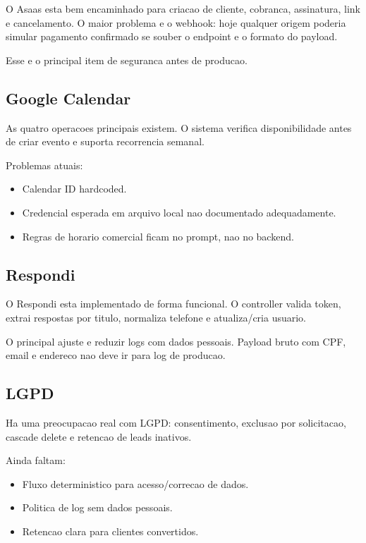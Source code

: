 \documentclass[11pt,a4paper]{article}
\begin{document}
O Asaas esta bem encaminhado para criacao de cliente, cobranca, assinatura, link e cancelamento. O maior problema e o webhook: hoje qualquer origem poderia simular pagamento confirmado se souber o endpoint e o formato do payload.

Esse e o principal item de seguranca antes de producao.

\subsection{Google Calendar}

As quatro operacoes principais existem. O sistema verifica disponibilidade antes de criar evento e suporta recorrencia semanal.

Problemas atuais:
\begin{itemize}
  \item Calendar ID hardcoded.
  \item Credencial esperada em arquivo local nao documentado adequadamente.
  \item Regras de horario comercial ficam no prompt, nao no backend.
\end{itemize}

\subsection{Respondi}

O Respondi esta implementado de forma funcional. O controller valida token, extrai respostas por titulo, normaliza telefone e atualiza/cria usuario.

O principal ajuste e reduzir logs com dados pessoais. Payload bruto com CPF, email e endereco nao deve ir para log de producao.

\subsection{LGPD}

Ha uma preocupacao real com LGPD: consentimento, exclusao por solicitacao, cascade delete e retencao de leads inativos.

Ainda faltam:
\begin{itemize}
  \item Fluxo deterministico para acesso/correcao de dados.
  \item Politica de log sem dados pessoais.
  \item Retencao clara para clientes convertidos.
\end{itemize}
\end{document}
